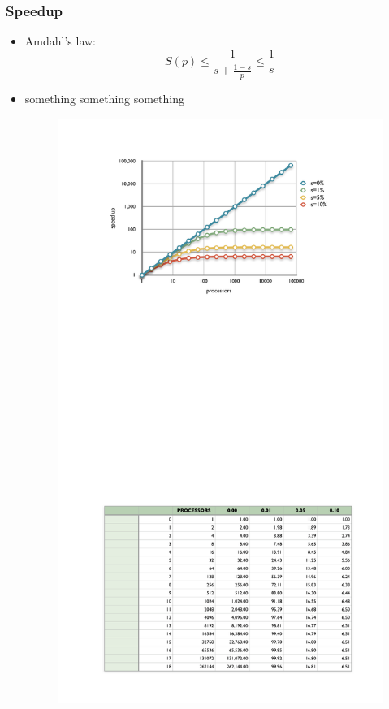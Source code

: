 \begin{frame}[fragile]
%
  \frametitle{Speedup}
%
  \begin{itemize}
%
  \item Amdahl's law:
    \[
    S(p) \leq \frac{1}{s+\frac{1-s}{p}} \leq \frac{1}{s}
    \]
%
  \item something something something 
    \begin{figure}
      \centering
      \includegraphics[scale=0.3]{figures/amdahl.pdf}
    \end{figure}
%
  \end{itemize}
%
\end{frame}

